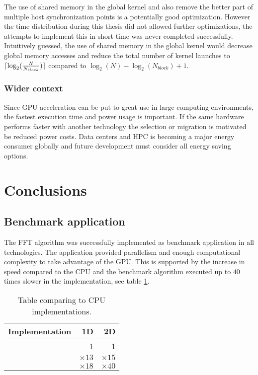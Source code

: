 
The use of shared memory in the global \gls{kernel} and also remove the better part of multiple host synchronization points is a potentially good optimization. However the time distribution during this thesis did not allowed further optimizations, the attempts to implement this in short time was never completed successfully. Intuitively guessed, the use of shared memory in the global kernel would decrease global memory accesses and reduce the total number of kernel launches to $\lceil\log_{2}(\frac{N}{N_{block}})\rceil$ compared to $\log_{2}(N) - \log_{2}(N_{block}) + 1$.

\subsubsection{Wider context}

Since \gls{GPU} acceleration can be put to great use in large computing environments, the fastest execution time and power usage is important. If the same hardware performs faster with another technology the selection or migration is motivated be reduced power costs. Data centers and \gls{HPC} is becoming a major energy consumer globally and future development must consider all energy saving options.

\section{Conclusions}

\subsection{Benchmark application}

The \gls{FFT} algorithm was successfully implemented as benchmark application in all technologies. The application provided parallelism and enough computational complexity to take advantage of the \gls{GPU}. This is supported by the increase in speed compared to the \gls{CPU} and the benchmark algorithm executed up to $40$ times slower in the {\CPP} implementation, see table \ref{tab:cu-vs-cpu}.

\begin{table}
	\centering	
	\begin{tabular}{|l|r|r|}
		\hline
		Implementation & 1D & 2D \\ \hline
		{\CU} & 1 & 1 \\ \hline
		{\OMP} & ${\times}13$ & ${\times}15$ \\ \hline
		{\CPP} & ${\times}18$ & ${\times}40$ \\ \hline
	\end{tabular}
	\caption{Table comparing {\CU} to CPU implementations.}
	\label{tab:cu-vs-cpu}
\end{table}

